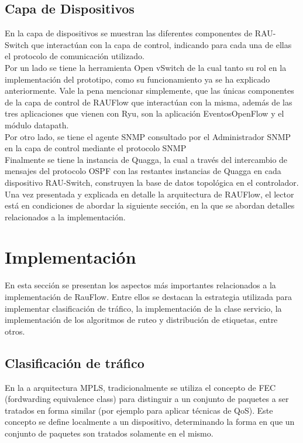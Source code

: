 \subsection{Capa de Dispositivos}
En la capa de dispositivos se muestran las diferentes componentes de RAU-Switch que interactúan con la capa de control, indicando para cada una de ellas el protocolo de comunicaci\'on utilizado.\\

Por un lado se tiene la herramienta Open vSwitch de la cual tanto su rol en la implementaci\'on del prototipo, como su funcionamiento ya se ha explicado anteriormente. Vale la pena mencionar simplemente, que las \'unicas componentes de la capa de control de RAUFlow que interact\'uan con la misma, adem\'as de las tres aplicaciones que vienen con Ryu, son la aplicaci\'on EventosOpenFlow y el m\'odulo datapath.\\

Por otro lado, se tiene el agente SNMP consultado por el Administrador SNMP en la capa de control mediante el protocolo SNMP\\

Finalmente se tiene la instancia de Quagga, la cual a través del intercambio de mensajes del protocolo OSPF con las restantes instancias de Quagga en cada dispositivo RAU-Switch, construyen la base de datos topol\'ogica en el controlador.\\

Una vez presentada y explicada en detalle la arquitectura de RAUFlow, el lector est\'a en condiciones de abordar la siguiente secci\'on, en la que se abordan detalles relacionados a la implementaci\'on.

\section[Implementaci\'on]{Implementaci\'on}

En esta secci\'on se presentan los aspectos m\'as importantes relacionados a la implementaci\'on de RauFlow. Entre ellos se destacan la estrategia utilizada para implementar clasificaci\'on de tr\'afico,  la implementaci\'on de la clase servicio, la implementaci\'on de los algoritmos de ruteo y distribución de etiquetas, entre otros.\\

\subsection{Clasificación de tr\'afico}
En la a arquitectura MPLS, tradicionalmente se utiliza el concepto de FEC (fordwarding equivalence class) para distinguir a un conjunto de paquetes a ser tratados en forma similar (por ejemplo para aplicar t\'ecnicas de QoS). Este concepto se define localmente a un dispositivo, determinando la forma en que un conjunto de paquetes son tratados solamente en el mismo.

